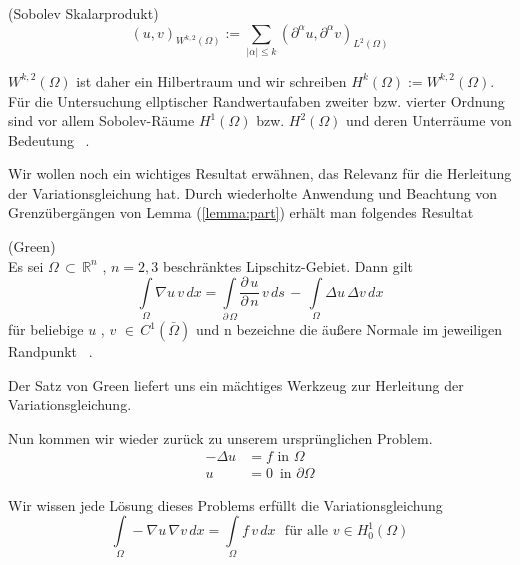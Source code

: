 \begin{Definition} (Sobolev Skalarprodukt) \\
\begin{equation*}
(u,v)_{{W^{{k,2}}(\Omega )}}:=\sum _{{|\alpha |\leq k}}(\partial ^{\alpha }u,\partial ^{\alpha }v)_{{L^{2}(\Omega )}}
\end{equation*}
\end{Definition}

$W^{{k,2}}(\Omega )$ ist daher ein Hilbertraum und wir schreiben $H^{k}(\Omega ):=W^{{k,2}}(\Omega )$.
Für die Untersuchung ellptischer Randwertaufaben zweiter bzw. vierter Ordnung sind vor allem Sobolev-Räume $H^1(\Omega)$ bzw. $H^2(\Omega)$ und deren Unterräume von Bedeutung ~\cite[134]{Numerik}. 

Wir wollen noch ein wichtiges Resultat erwähnen, das Relevanz für die Herleitung der Variationsgleichung hat.
Durch wiederholte Anwendung und Beachtung von Grenzübergängen von Lemma (\ref{lemma:part}) erhält man folgendes Resultat

\begin{Satz} (Green) \\
Es sei $\Omega \, \subset \, \mathbb{R}^{n}$ , $n=2,3$ beschränktes Lipschitz-Gebiet. Dann gilt
\begin{equation*}
\int\limits_{\Omega} \nabla u \, v \, dx = \int\limits_{\partial \, \Omega} \dfrac{\partial \, u}{\partial \, n} \, v \, ds \, - \,
\int\limits_{\Omega} \Delta u \, \Delta v \, dx
\end{equation*}
für beliebige $u$ , $v$ $\in \, C^1(\bar{\Omega})$ und n bezeichne die äußere Normale im jeweiligen Randpunkt ~\cite[140]{Numerik}.
\end{Satz}
Der Satz von Green liefert uns ein mächtiges Werkzeug zur Herleitung der Variationsgleichung.

Nun kommen wir wieder zurück zu unserem ursprünglichen Problem.
\begin{equation*} 
\begin{aligned}
	- \Delta u &= f \text{ in } \Omega \\
	u &= 0 \, \text{ in } \partial \Omega	
\end{aligned}
\end{equation*}

Wir wissen jede Lösung dieses Problems erfüllt die Variationsgleichung
\begin{equation}  \label{eq:vary}
\int\limits_{\Omega} - \nabla u \, \nabla v \, dx = \int\limits_{\Omega} f \, v \, dx \, \, \text{ für alle } v \in H^1_0(\Omega)
\end{equation}

